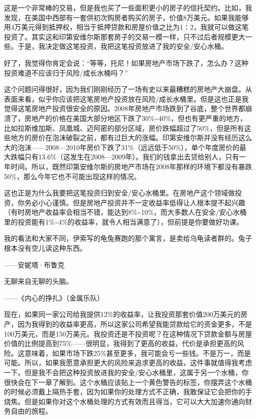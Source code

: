 这是一个非常棒的交易，但是我也买了一些面积更小的房子的信托契约。比如，我发现，在美国中西部有一套供初次购房者购买的房子，价值8万美元。如果我能够用4万美元得到抵押权，相当于抵押贷款和房屋价值之比为1∶2，我就可以做这笔投资了。其实这和印第安维尔斯那套房子的交易一模一样，只不过后者规模更大一些。于是，我决定做这笔投资，我把这笔投资放进了我的安全/安心水桶。

好了，我觉得你肯定会说：“等等，托尼！如果房地产市场下跌了，怎么办？这种投资难道不应该归于风险/成长水桶吗？”

这个问题问得很好，因为我们刚刚经历了一场有史以来最糟糕的房地产大崩盘。从表面来看，似乎你应该把这笔房地产投资放在风险/成长水桶里。但是这也正是我觉得这笔房地产投资很安全的原因。2008年房地产市场跌到了谷底，整个世界都崩溃了，房地产的价格在美国大部分地区下跌了30\%\textasciitilde{}40\%，但也有更严重的地方，比如拉斯维加斯、凤凰城、迈阿密的部分区域，房价跌幅超过了50\%，但是所有这些地方的房价在泡沫破裂之前，都有过巨大的涨幅。印第安维尔斯并没有经历这么大的泡沫——2008—2010年房价下跌了31\%（远远低于50\%），单个年度房价的最大跌幅只有13.6\%（这发生在2008—2009年）。我们的钱拿出去贷给别人，只有一年时间。所以，既然印第安维尔斯的房地产市场在2008年那样的环境下都没有暴跌50\%，那么今年它也不可能出现这样的情况。

这也正是为什么我要把这笔投资归到安全/安心水桶里。在房地产这个领域做投资，你务必小心谨慎。但是房地产投资并不一定收益率低得让人根本提不起兴趣（有时房地产收益率会相当不错，能达到8\%\textasciitilde{}10\%，而大多数人在安全/安心水桶里的投资能有1\%\textasciitilde{}4\%的收益率，就令人相当满意了），但前提是你要做好功课。

\begin{BookQuote}
我的看法和大家不同，伊索写的龟兔赛跑的那个寓言，是卖给乌龟读者群的。兔子根本没有空儿读这种东西。

\hfill ——安妮塔·布鲁克
\end{BookQuote}

\begin{BookQuote}
无聊来自无聊的头脑。

\hfill ——《内心的挣扎》（金属乐队）
\end{BookQuote}

现在，如果同一家公司给我提供12\%的收益率，让我投资那套价值200万美元的房产，因为我得到的收益率更高，所以这家公司希望我能贷款给它的资金更多，不是100万美元，而是150万美元。我投资还是不投资呢？在这种情况下贷款金额与房屋价值的比例提高到75\%——很明显，我得到了更高的收益，代价是承担更高的风险。这意味着，如果市场下跌25\%甚至更多，我可能会亏一些钱。不是万一，而是可能。所以，如果我愿意承担更大的风险来追求更高的收益，这件事就值得我考虑一下。但是我不会把这种投资放进我的安全/安心水桶里，这属于另一个水桶，你很快会在下一章了解到。这个水桶应该贴上一个黄色警告的标签，你摆弄这个水桶的时候必须戴上隔热手套，因为如果你的处理方式不正确，我敢保证它会把你的手烧焦。但是如果你对这个水桶处理的方式有效而且得当，它可以大大加速你通向财务自由的旅程。

